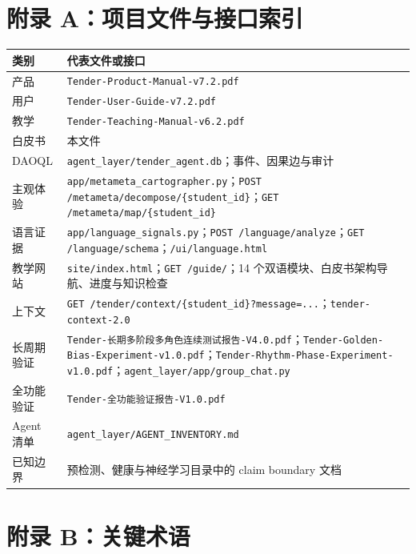 \documentclass[UTF8,a4paper,11pt]{ctexart}
\begin{document}
\newpage
\appendix
\section{附录 A：项目文件与接口索引}

\begin{center}
\begin{longtable}{@{}p{4.2cm}p{8.8cm}@{}}
\toprule
\textbf{类别} & \textbf{代表文件或接口} \\
\midrule
产品 & \texttt{Tender-Product-Manual-v7.2.pdf} \\
用户 & \texttt{Tender-User-Guide-v7.2.pdf} \\
教学 & \texttt{Tender-Teaching-Manual-v6.2.pdf} \\
白皮书 & 本文件 \\
DAOQL & \texttt{agent\_layer/tender\_agent.db}；事件、因果边与审计 \\
主观体验 & \texttt{app/metameta\_cartographer.py}；\texttt{POST /metameta/decompose/\{student\_id\}}；\texttt{GET /metameta/map/\{student\_id\}} \\
语言证据 & \texttt{app/language\_signals.py}；\texttt{POST /language/analyze}；\texttt{GET /language/schema}；\texttt{/ui/language.html} \\
教学网站 & \texttt{site/index.html}；\texttt{GET /guide/}；14 个双语模块、白皮书架构导航、进度与知识检查 \\
上下文 & \texttt{GET /tender/context/\{student\_id\}?message=...}；\texttt{tender-context-2.0} \\
长周期验证 & \texttt{Tender-长期多阶段多角色连续测试报告-V4.0.pdf}；\texttt{Tender-Golden-Bias-Experiment-v1.0.pdf}；\texttt{Tender-Rhythm-Phase-Experiment-v1.0.pdf}；\texttt{agent\_layer/app/group\_chat.py} \\
全功能验证 & \texttt{Tender-全功能验证报告-V1.0.pdf} \\
Agent 清单 & \texttt{agent\_layer/AGENT\_INVENTORY.md} \\
已知边界 & 预检测、健康与神经学习目录中的 claim boundary 文档 \\
\bottomrule
\end{longtable}
\end{center}

\section{附录 B：关键术语}
\end{document}
